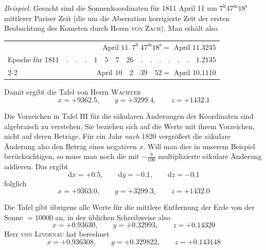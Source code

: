 \emph{Beispiel.} Gesucht sind die Sonnenkoordinaten für 1811 April 11 um $7^{\mathrm h}47^{\mathrm m}18^{\mathrm s}$ mittlerer Pariser Zeit (die um die Aberration korrigierte Zeit der ersten Beobachtung des Kometen durch Herrn \textsc{von Zach}). Man erhält also
\begin{center}
\begin{tabular}{lr}
& April $11.\ 7^{\mathrm h}\ 47^{\mathrm m}18^{\mathrm s}=$ April $11.3245$\\
Epoche für 1811 & $.\quad.\quad.\quad1\quad5\quad7\quad26\quad.\quad.\quad.\quad.\quad.\quad.\quad1.2135$\\\cline{2-2}
& April $10\quad2\quad39\quad52=$ April $10.1110$
\end{tabular}
\end{center}
Damit ergibt die Tafel von Herrn \textsc{Wachter}
\[
x=+9362.5,\qquad y=+3299.4,\qquad z=+1432.1
\]

Die Vorzeichen in Tafel III für die säkularen Änderungen der Koordinaten sind algebraisch zu verstehen. Sie beziehen sich auf die Werte mit ihrem Vorzeichen, nicht auf deren Beträge. Für ein Jahr \emph{nach} 1820 vergrößert die säkulare Änderung also den Betrag eines negativen $x$. Will man dies in unserem Beispiel berücksichtigen, so muss man noch die mit $-\frac9{100}$ multiplizierte säkulare Änderung addieren. Das ergibt
\[
\mathrm dx=+0.5,\qquad\mathrm dy=-0.1,\qquad\mathrm dz=-0.1
\]
folglich
\[
x=+9363.0,\qquad y=+3299.3,\qquad z=+1432.0
\]
%

Die Tafel gibt übrigens alle Werte für die mittlere Entfernung der Erde von der Sonne $=10000$ an, in der üblichen Schreibweise also
\[
x=+0.93630,\qquad y=+0.32993,\qquad z=+0.14320
\]
Herr \textsc{von Lindenau} hat berechnet
\[
x=+0.936308,\qquad y=+0.329822,\qquad z=+0.143148
\]

